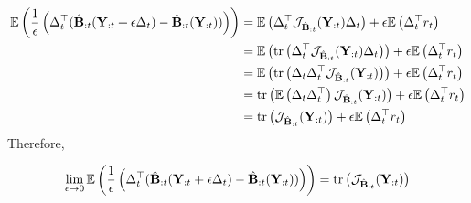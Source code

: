 \documentclass[a4paper,10pt]{article}
\theoremstyle{definition}
\begin{document}
\begin{align*}
    \mathbb{E} \left(
        \frac{1}{\epsilon}
        \left(
            \Delta_t^{\top} (\hat{\mathbf{B}}_{:t}(\mathbf{Y}_{:t}
            + \epsilon \Delta_t) - \hat{\mathbf{B}}_{:t}(\mathbf{Y}_{:t}))
        \right)
    \right)
    &=
    \mathbb{E} \left(
        \Delta_t^{\top} \mathcal{J}_{\hat{\mathbf{B}}_{:t}}(\mathbf{Y}_{:t}) \Delta_t
    \right) + \epsilon \mathbb{E} \left( \Delta_t^{\top} r_t \right)\\
    &=
    \mathbb{E} \left(
        \operatorname{tr} \left(
            \Delta_t^{\top} \mathcal{J}_{\hat{\mathbf{B}}_{:t}}(\mathbf{Y}_{:t}) \Delta_t
        \right)
    \right) + \epsilon \mathbb{E} \left( \Delta_t^{\top} r_t \right)\\
    &=
    \mathbb{E} \left(
        \operatorname{tr} \left(
            \Delta_t \Delta_t^{\top} \mathcal{J}_{\hat{\mathbf{B}}_{:t}}(\mathbf{Y}_{:t})
        \right)
    \right) + \epsilon \mathbb{E} \left( \Delta_t^{\top} r_t \right)\\
    &=
    \operatorname{tr} \left(
        \mathbb{E} \left(
            \Delta_t \Delta_t^{\top}
        \right)
        \mathcal{J}_{\hat{\mathbf{B}}_{:t}}(\mathbf{Y}_{:t})
    \right) + \epsilon \mathbb{E} \left( \Delta_t^{\top} r_t \right)\\
    &=
    \operatorname{tr} \left(
        \mathcal{J}_{\hat{\mathbf{B}}_{:t}}(\mathbf{Y}_{:t})
    \right) + \epsilon \mathbb{E} \left( \Delta_t^{\top} r_t \right)
\end{align*}
%
Therefore,

\begin{equation*}
    \lim_{\epsilon \rightarrow 0} \mathbb{E} \left(
        \frac{1}{\epsilon}
        \left(
            \Delta_t^{\top} (\hat{\mathbf{B}}_{:t}(\mathbf{Y}_{:t}
            + \epsilon \Delta_t) - \hat{\mathbf{B}}_{:t}(\mathbf{Y}_{:t}))
        \right)
    \right)
    = \operatorname{tr} \left(
        \mathcal{J}_{\hat{\mathbf{B}}_{:t}}(\mathbf{Y}_{:t})
    \right)
\end{equation*}

\newpage


\end{document}
